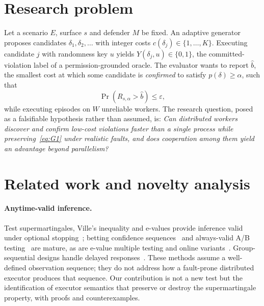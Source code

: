 \documentclass[11pt]{article}
\theoremstyle{definition}
\theoremstyle{remark}
\newcommand{\Prob}{\Pr}
\newcommand{\bhat}{\hat b}
\begin{document}
\section{Research problem}\label{sec:problem}

Let a scenario $E$, surface $s$ and defender $M$ be fixed. An adaptive generator proposes candidates $\delta_1,\delta_2,\dots$ with integer costs $c(\delta_j)\in\{1,\dots,K\}$. Executing candidate $j$ with randomness key $u$ yields $Y(\delta_j,u)\in\{0,1\}$, the committed-violation label of a permission-grounded oracle. The evaluator wants to report $\bhat$, the smallest cost at which some candidate is \emph{confirmed} to satisfy $p(\delta)\ge\alpha$, such that
\begin{equation}
\Prob(R_{s,\alpha} > \bhat)\le\varepsilon,\label{eq:G1}
\end{equation}
while executing episodes on $W$ unreliable workers. The research question, posed as a falsifiable hypothesis rather than assumed, is: \emph{Can distributed workers discover and confirm low-cost violations faster than a single process while preserving~\eqref{eq:G1} under realistic faults, and does cooperation among them yield an advantage beyond parallelism?}

\section{Related work and novelty analysis}\label{sec:related}

\paragraph{Anytime-valid inference.} Test supermartingales, Ville's inequality and e-values provide inference valid under optional stopping~\cite{ramdas2023savi,vovk2021,grunwald2024safe}; betting confidence sequences~\cite{waudbysmith2024,howard2021} and always-valid A/B testing~\cite{johari2022} are mature, as are e-value multiple testing and online variants~\cite{wang2022ebh,xu2024online,foster2008}. Group-sequential designs handle delayed responses~\cite{hampson2013}. These methods assume a well-defined observation sequence; they do not address how a fault-prone distributed executor produces that sequence. Our contribution is not a new test but the identification of executor semantics that preserve or destroy the supermartingale property, with proofs and counterexamples.
\end{document}
